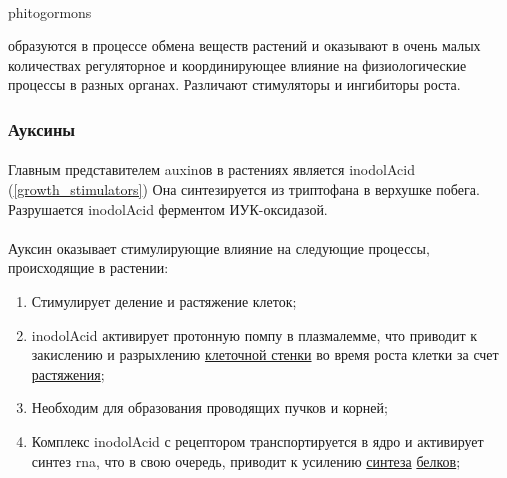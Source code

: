 \paragraph*{}\hypertarget{gormons}{\gls{phitogormons}} образуются в процессе обмена веществ растений и оказывают в очень малых количествах регуляторное и координирующее влияние на физиологические процессы в разных органах. Различают стимуляторы и ингибиторы роста. 


\subsubsection*{Ауксины}

\paragraph*{}Главным представителем \hypertarget{auxsin}{\gls{auxin}ов} в растениях является \gls{inodolAcid} (\ris \ref{growth_stimulators}) Она синтезируется из триптофана в верхушке побега. Разрушается \gls{inodolAcid} ферментом ИУК-оксидазой. 

\paragraph*{}Ауксин оказывает стимулирующие влияние на следующие процессы, происходящие в растении:

\begin{enumerate}
	\item Стимулирует деление и растяжение клеток;
	\item \gls{inodolAcid} активирует протонную помпу в плазмалемме, что приводит к закислению и разрыхлению \hyperlink{cell_wall}{клеточной стенки} во время роста клетки за счет \hyperlink{strainGrowth}{растяжения};
	\item Необходим для образования проводящих пучков и корней;
	\item Комплекс \gls{inodolAcid} с рецептором транспортируется в ядро и активирует синтез \gls{rna}, что в свою очередь, приводит к усилению \hyperlink{proteinSintez}{синтеза} \hyperlink{proteins}{белков};
\end{enumerate}


